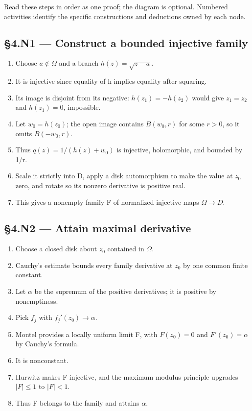 \documentclass[preprint,12pt,aps,pra,showkeys,amsmath,amssymb,superscriptaddress,floatfix]{revtex4-2}
\theoremstyle{definition}
\theoremstyle{remark}
\begin{document}
Read these steps in order as one proof; the diagram is optional.
Numbered activities identify the specific constructions and deductions
owned by each node.

\subsection{§4.N1 --- Construct a bounded injective
family}\label{n1-construct-a-bounded-injective-family}

\begin{enumerate}
\def\labelenumi{\arabic{enumi}.}
\item
  Choose \(a\notin \Omega\) and a branch \(h(z)=\sqrt{z-a}\).
\item
  It is injective since equality of h implies equality after squaring.
\item
  Its image is disjoint from its negative: \(h(z_{1})=-h(z_{2})\) would
  give \(z_{1}=z_{2}\) and \(h(z_{1})=0\), impossible.
\item
  Let \(w_{0}=h(z_{0})\); the open image contains \(B(w_{0},r)\) for
  some \(r>0\), so it omits \(B(-w_{0},r)\).
\item
  Thus \(q(z)=1/(h(z)+w_{0})\) is injective, holomorphic, and bounded by
  1/r.
\item
  Scale it strictly into D, apply a disk automorphism to make the value
  at \(z_{0}\) zero, and rotate so its nonzero derivative is positive
  real.
\item
  This gives a nonempty family F of normalized injective maps
  \(\Omega \to D\).
\end{enumerate}

\subsection{§4.N2 --- Attain maximal
derivative}\label{n2-attain-maximal-derivative}

\begin{enumerate}
\def\labelenumi{\arabic{enumi}.}
\item
  Choose a closed disk about \(z_{0}\) contained in \(\Omega\).
\item
  Cauchy's estimate bounds every family derivative at \(z_{0}\) by one
  common finite constant.
\item
  Let \(\alpha\) be the supremum of the positive derivatives; it is
  positive by nonemptiness.
\item
  Pick \(f_j\) with \(f_j'(z_{0})\to \alpha\).
\item
  Montel provides a locally uniform limit F, with \(F(z_{0})=0\) and
  \(F'(z_{0})=\alpha\) by Cauchy's formula.
\item
  It is nonconstant.
\item
  Hurwitz makes F injective, and the maximum modulus principle upgrades
  \(|F|\le 1\) to \(|F|<1\).
\item
  Thus F belongs to the family and attains \(\alpha\).
\end{enumerate}
\end{document}
